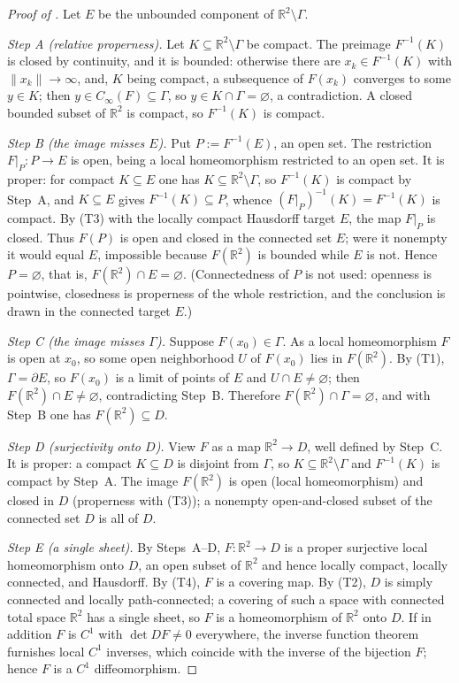 \documentclass[11pt,twoside,leqno]{article}
\theoremstyle{plain}
\theoremstyle{definition}
\theoremstyle{remark}
\newcommand{\R}{\mathbb{R}}
\newcommand{\norm}[1]{\lVert #1 \rVert}
\newcommand{\clinf}{C_{\infty}}
\begin{document}
\begin{proof}[Proof of ]
Let $E$ be the unbounded component of $\R^2\setminus\Gamma$.

\emph{Step A (relative properness).} Let $K\subseteq\R^2\setminus\Gamma$ be compact. The preimage $F^{-1}(K)$ is closed by continuity, and it is bounded: otherwise there are $x_k\in F^{-1}(K)$ with $\norm{x_k}\to\infty$, and, $K$ being compact, a subsequence of $F(x_k)$ converges to some $y\in K$; then $y\in\clinf(F)\subseteq\Gamma$, so $y\in K\cap\Gamma=\varnothing$, a contradiction. A closed bounded subset of $\R^2$ is compact, so $F^{-1}(K)$ is compact.

\emph{Step B (the image misses $E$).} Put $P:=F^{-1}(E)$, an open set. The restriction $F|_P\colon P\to E$ is open, being a local homeomorphism restricted to an open set. It is proper: for compact $K\subseteq E$ one has $K\subseteq\R^2\setminus\Gamma$, so $F^{-1}(K)$ is compact by Step~A, and $K\subseteq E$ gives $F^{-1}(K)\subseteq P$, whence $(F|_P)^{-1}(K)=F^{-1}(K)$ is compact. By (T3) with the locally compact Hausdorff target $E$, the map $F|_P$ is closed. Thus $F(P)$ is open and closed in the connected set $E$; were it nonempty it would equal $E$, impossible because $F(\R^2)$ is bounded while $E$ is not. Hence $P=\varnothing$, that is, $F(\R^2)\cap E=\varnothing$. (Connectedness of $P$ is not used: openness is pointwise, closedness is properness of the whole restriction, and the conclusion is drawn in the connected target $E$.)

\emph{Step C (the image misses $\Gamma$).} Suppose $F(x_0)\in\Gamma$. As a local homeomorphism $F$ is open at $x_0$, so some open neighborhood $U$ of $F(x_0)$ lies in $F(\R^2)$. By (T1), $\Gamma=\partial E$, so $F(x_0)$ is a limit of points of $E$ and $U\cap E\neq\varnothing$; then $F(\R^2)\cap E\neq\varnothing$, contradicting Step~B. Therefore $F(\R^2)\cap\Gamma=\varnothing$, and with Step~B one has $F(\R^2)\subseteq D$.

\emph{Step D (surjectivity onto $D$).} View $F$ as a map $\R^2\to D$, well defined by Step~C. It is proper: a compact $K\subseteq D$ is disjoint from $\Gamma$, so $K\subseteq\R^2\setminus\Gamma$ and $F^{-1}(K)$ is compact by Step~A. The image $F(\R^2)$ is open (local homeomorphism) and closed in $D$ (properness with (T3)); a nonempty open-and-closed subset of the connected set $D$ is all of $D$.

\emph{Step E (a single sheet).} By Steps~A--D, $F\colon\R^2\to D$ is a proper surjective local homeomorphism onto $D$, an open subset of $\R^2$ and hence locally compact, locally connected, and Hausdorff. By (T4), $F$ is a covering map. By (T2), $D$ is simply connected and locally path-connected; a covering of such a space with connected total space $\R^2$ has a single sheet, so $F$ is a homeomorphism of $\R^2$ onto $D$. If in addition $F$ is $C^1$ with $\det DF\neq0$ everywhere, the inverse function theorem furnishes local $C^1$ inverses, which coincide with the inverse of the bijection $F$; hence $F$ is a $C^1$ diffeomorphism.
\end{proof}
\end{document}
